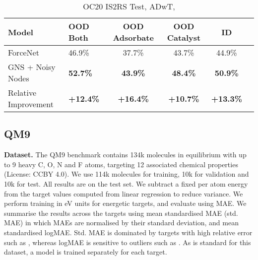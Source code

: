 \documentclass{article} \usepackage{iclr2022_conference,times}
\begin{document}
\begin{table}
\captionsetup{justification=centering}
\caption{OC20 IS2RS Validation, ADwT, }
\label{table_2_our_performance_positions_validation}
\centering
{}
\end{table}



\begin{table}
\caption{OC20 IS2RS Test, ADwT, }
\label{tab:positions_test}
\centering
\begin{tabular}{llcccc}
  \toprule
  Model & OOD Both & OOD Adsorbate & OOD Catalyst & ID \\
  \midrule
  ForceNet & 46.9\% & 37.7\% & 43.7\% & 44.9\% \\
  
  GNS + Noisy Nodes & \textbf{52.7\%} & \textbf{43.9\%} & \textbf{48.4\%} & \textbf{50.9\%} \\
  \midrule
  Relative Improvement & \textbf{+12.4\%} & \textbf{+16.4\%} & \textbf{+10.7\%} & \textbf{+13.3\%} \\
  \bottomrule
\end{tabular}
\end{table}

\subsection{QM9}\label{eval-qm9}
\textbf{Dataset.} The QM9 benchmark \citep{Ramakrishnan2014QuantumCS} contains 134k molecules in equilibrium with up to 9 heavy C, O, N and F atoms, targeting 12 associated chemical properties (License: CCBY 4.0). We use 114k molecules for training, 10k for validation and 10k for test. All results are on the test set. We subtract a fixed per atom energy from the target values computed from linear regression to reduce variance.  We perform training in eV units for energetic targets, and evaluate using MAE. We summarise the results across the targets using mean standardised MAE (std. MAE) in which MAEs are normalised by their standard deviation, and mean standardised logMAE. Std. MAE is dominated by targets with high relative error such as , whereas logMAE is sensitive to outliers such as . As is standard for this dataset, a model is trained separately for each target.
\end{document}
